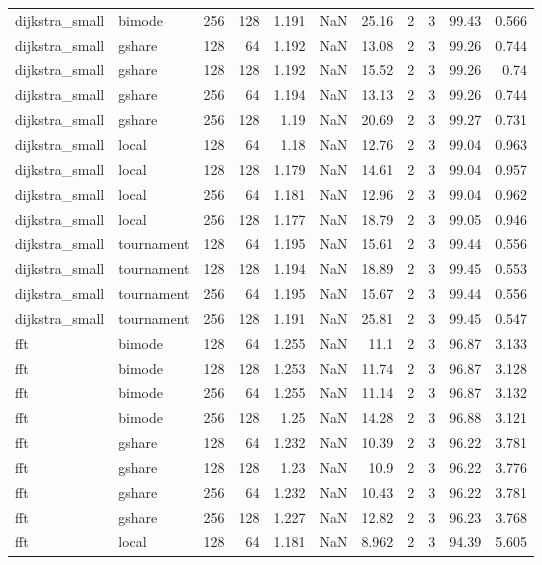 \begin{tabular}{llrrrrrrrrr}
dijkstra_small & bimode & 256 & 128 & 1.191 & NaN & 25.16 & 2 & 3 & 99.43 & 0.566 \\
dijkstra_small & gshare & 128 & 64 & 1.192 & NaN & 13.08 & 2 & 3 & 99.26 & 0.744 \\
dijkstra_small & gshare & 128 & 128 & 1.192 & NaN & 15.52 & 2 & 3 & 99.26 & 0.74 \\
dijkstra_small & gshare & 256 & 64 & 1.194 & NaN & 13.13 & 2 & 3 & 99.26 & 0.744 \\
dijkstra_small & gshare & 256 & 128 & 1.19 & NaN & 20.69 & 2 & 3 & 99.27 & 0.731 \\
dijkstra_small & local & 128 & 64 & 1.18 & NaN & 12.76 & 2 & 3 & 99.04 & 0.963 \\
dijkstra_small & local & 128 & 128 & 1.179 & NaN & 14.61 & 2 & 3 & 99.04 & 0.957 \\
dijkstra_small & local & 256 & 64 & 1.181 & NaN & 12.96 & 2 & 3 & 99.04 & 0.962 \\
dijkstra_small & local & 256 & 128 & 1.177 & NaN & 18.79 & 2 & 3 & 99.05 & 0.946 \\
dijkstra_small & tournament & 128 & 64 & 1.195 & NaN & 15.61 & 2 & 3 & 99.44 & 0.556 \\
dijkstra_small & tournament & 128 & 128 & 1.194 & NaN & 18.89 & 2 & 3 & 99.45 & 0.553 \\
dijkstra_small & tournament & 256 & 64 & 1.195 & NaN & 15.67 & 2 & 3 & 99.44 & 0.556 \\
dijkstra_small & tournament & 256 & 128 & 1.191 & NaN & 25.81 & 2 & 3 & 99.45 & 0.547 \\
fft & bimode & 128 & 64 & 1.255 & NaN & 11.1 & 2 & 3 & 96.87 & 3.133 \\
fft & bimode & 128 & 128 & 1.253 & NaN & 11.74 & 2 & 3 & 96.87 & 3.128 \\
fft & bimode & 256 & 64 & 1.255 & NaN & 11.14 & 2 & 3 & 96.87 & 3.132 \\
fft & bimode & 256 & 128 & 1.25 & NaN & 14.28 & 2 & 3 & 96.88 & 3.121 \\
fft & gshare & 128 & 64 & 1.232 & NaN & 10.39 & 2 & 3 & 96.22 & 3.781 \\
fft & gshare & 128 & 128 & 1.23 & NaN & 10.9 & 2 & 3 & 96.22 & 3.776 \\
fft & gshare & 256 & 64 & 1.232 & NaN & 10.43 & 2 & 3 & 96.22 & 3.781 \\
fft & gshare & 256 & 128 & 1.227 & NaN & 12.82 & 2 & 3 & 96.23 & 3.768 \\
fft & local & 128 & 64 & 1.181 & NaN & 8.962 & 2 & 3 & 94.39 & 5.605 \\

\end{tabular}
